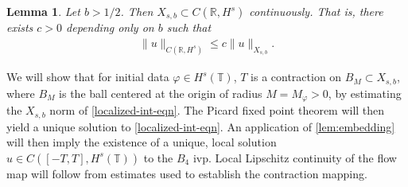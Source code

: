 \documentclass[12pt,reqno]{amsart}
\numberwithin{equation}{section}  %
\numberwithin{figure}{section}
\newcommand{\rr}{\mathbb{R}}
\newcommand{\ci}{\mathbb{T}}
\newcommand{\vp}{\varphi}
\theoremstyle{plain}
\newtheorem{lemma}{Lemma}
\theoremstyle{definition}
\theoremstyle{remark}
\begin{document}
%
%
\begin{lemma}
  Let $b > 1/2$. Then $X_{s, b} \subset C(\rr, H^s)$ continuously. That is, there exists $c>0$ depending only on $b$ such that
%
%
\begin{equation*}
\begin{split}
  \| u \|_{C(\rr, H^s) } \le c \| u \|_{X_{s,b}}.
\end{split}
\end{equation*}
%
\label{lem:embedding}
\end{lemma}
%
%
We will 
show that for initial data $\vp \in {H}^s(\ci)$, $T$ is a contraction on $B_M 
\subset {X}_{s,b}$, where $B_M$ is the ball centered at the origin of radius $M = 
M_{\vp}> 0$, by estimating the $X_{s,b}$
norm of \eqref{localized-int-eqn}. The Picard fixed point theorem will
then yield a unique solution to
\eqref{localized-int-eqn}. An application of \autoref{lem:embedding}
will then imply the existence of a unique, local
solution $u \in C([-T, T], H^s(\ci))$ to the $B_4$ ivp. Local Lipschitz continuity of the flow map will follow from estimates used to establish the contraction mapping. %
%
%
%
%
%
%
%
%
%
\end{document}
